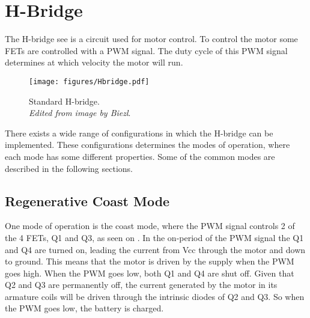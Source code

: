 
\section{H-Bridge}\label{sec:HBridge}
The H-bridge see  is a circuit used for motor control. To control the motor some FETs are controlled with a PWM signal. The duty cycle of this PWM signal determines at which velocity the motor will run.\cite{DCook}

\begin{figure}[H]
	\centering
	\texttt{[image: figures/Hbridge.pdf]}
	\caption{Standard H-bridge.\\ \emph{Edited from image by Biezl}.\cite{Biezl}}
	\label{Hbridge}
\end{figure}\vspace{-5mm}

There exists a wide range of configurations in which the H-bridge can be implemented. These configurations determines the modes of operation, where each mode has some different properties. Some of the common modes are described in the following sections.\cite{DCook}

\subsection{Regenerative Coast Mode}
One mode of operation is the coast mode, where the PWM signal controls 2 of the 4 FETs, Q1 and Q3, as seen on . In the on-period of the PWM signal the Q1 and Q4 are turned on, leading the current from Vcc through the motor and down to ground. This means that the motor is driven by the supply when the PWM goes high. When the PWM goes low, both Q1 and Q4 are shut off. Given that Q2 and Q3 are permanently off, the current generated by the motor in its armature coils will be driven through the intrinsic diodes of Q2 and Q3. So when the PWM goes low, the battery is charged.\cite{PAndersen}


